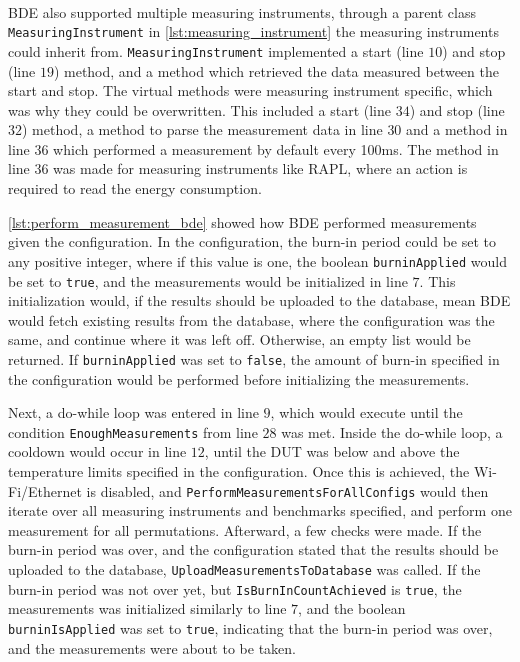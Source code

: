 

\paragraph*{}
BDE also supported multiple measuring instruments, through a parent class \texttt{MeasuringInstrument} in \cref{lst:measuring_instrument} the measuring instruments could inherit from. \texttt{MeasuringInstrument} implemented a start (line $10$) and stop (line $19$) method, and a method which retrieved the data measured between the start and stop. The virtual methods were measuring instrument specific, which was why they could be overwritten. This included a start (line $34$) and stop (line $32$) method, a method to parse the measurement data in line $30$ and a method in line $36$ which performed a measurement by default every 100ms. The method in line $36$ was made for measuring instruments like RAPL, where an action is required to read the energy consumption.
\newpage



\cref{lst:perform_measurement_bde} showed how BDE performed measurements given the configuration. In the configuration, the burn-in period could be set to any positive integer, where if this value is one, the boolean \texttt{burninApplied} would be set to \texttt{true}, and the measurements would be initialized in line $7$. This initialization would, if the results should be uploaded to the database, mean BDE would fetch existing results from the database, where the configuration was the same, and continue where it was left off. Otherwise, an empty list would be returned. If \texttt{burninApplied} was set to \texttt{false}, the amount of burn-in specified in the configuration would be performed before initializing the measurements.

Next, a do-while loop was entered in line $9$, which would execute until the condition \texttt{EnoughMeasurements} from line $28$ was met. Inside the do-while loop, a cooldown would occur in line $12$, until the DUT was below and above the temperature limits specified in the configuration. Once this is achieved, the Wi-Fi/Ethernet is disabled, and \texttt{PerformMeasurementsForAllConfigs} would then iterate over all measuring instruments and benchmarks specified, and perform one measurement for all permutations. Afterward, a few checks were made. If the burn-in period was over, and the configuration stated that the results should be uploaded to the database, \texttt{UploadMeasurementsToDatabase} was called. If the burn-in period was not over yet, but \texttt{IsBurnInCountAchieved} is \texttt{true}, the measurements was initialized similarly to line $7$, and the boolean \texttt{burninIsApplied} was set to \texttt{true}, indicating that the burn-in period was over, and the measurements were about to be taken. 
